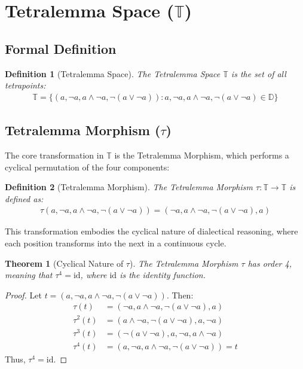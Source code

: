 \documentclass[11pt,a4paper]{article}
\newtheorem{definition}{Definition}
\newtheorem{theorem}{Theorem}
\begin{document}
\section{Tetralemma Space ($\mathbb{T}$)}

\subsection{Formal Definition}

\begin{definition}[Tetralemma Space]
The Tetralemma Space $\mathbb{T}$ is the set of all tetrapoints:
\begin{align}
\mathbb{T} = \{(a, \neg a, a \wedge \neg a, \neg(a \vee \neg a)) : a, \neg a, a \wedge \neg a, \neg(a \vee \neg a) \in \mathbb{D}\}
\end{align}
\end{definition}

\subsection{Tetralemma Morphism ($\tau$)}

The core transformation in $\mathbb{T}$ is the Tetralemma Morphism, which performs a cyclical permutation of the four components:

\begin{definition}[Tetralemma Morphism]
The Tetralemma Morphism $\tau: \mathbb{T} \rightarrow \mathbb{T}$ is defined as:
\begin{align}
\tau(a, \neg a, a \wedge \neg a, \neg(a \vee \neg a)) = (\neg a, a \wedge \neg a, \neg(a \vee \neg a), a)
\end{align}
\end{definition}

This transformation embodies the cyclical nature of dialectical reasoning, where each position transforms into the next in a continuous cycle.

\begin{theorem}[Cyclical Nature of $\tau$]
The Tetralemma Morphism $\tau$ has order 4, meaning that $\tau^4 = \text{id}$, where $\text{id}$ is the identity function.
\end{theorem}

\begin{proof}
Let $t = (a, \neg a, a \wedge \neg a, \neg(a \vee \neg a))$. Then:
\begin{align}
\tau(t) &= (\neg a, a \wedge \neg a, \neg(a \vee \neg a), a) \\
\tau^2(t) &= (a \wedge \neg a, \neg(a \vee \neg a), a, \neg a) \\
\tau^3(t) &= (\neg(a \vee \neg a), a, \neg a, a \wedge \neg a) \\
\tau^4(t) &= (a, \neg a, a \wedge \neg a, \neg(a \vee \neg a)) = t
\end{align}
Thus, $\tau^4 = \text{id}$.
\end{proof}
\end{document}
